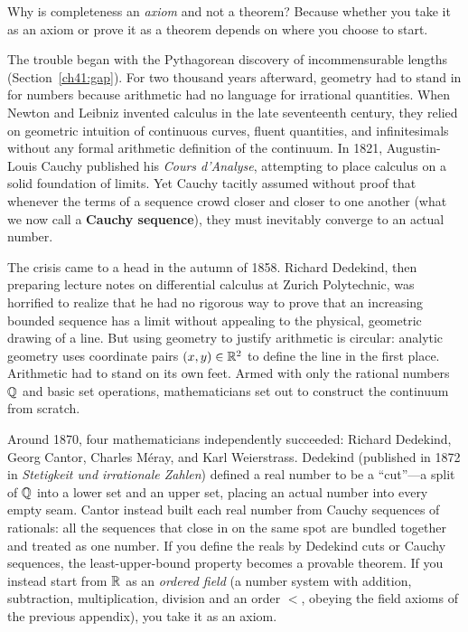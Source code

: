 \begin{historybox}
Why is completeness an \emph{axiom} and not a theorem? Because whether you take it as an
axiom or prove it as a theorem depends on where you choose to start.

The trouble began with the Pythagorean discovery of incommensurable lengths
(Section~\ref{ch41:gap}). For two thousand years afterward, geometry had to stand in
for numbers because arithmetic had no language for irrational quantities. When Newton and Leibniz
invented calculus in the late seventeenth century, they relied on geometric intuition of continuous
curves, fluent quantities, and infinitesimals without any formal arithmetic definition of the continuum.
In 1821, Augustin-Louis Cauchy published his \emph{Cours d'Analyse}, attempting to place calculus on
a solid foundation of limits. Yet Cauchy tacitly assumed without proof that whenever the terms of a
sequence crowd closer and closer to one another (what we now call a \textbf{Cauchy sequence}), they
must inevitably converge to an actual number.

The crisis came to a head in the autumn of 1858. Richard Dedekind, then preparing lecture notes
on differential calculus at Zurich Polytechnic, was horrified to realize that he had no rigorous
way to prove that an increasing bounded sequence has a limit without appealing to the physical,
geometric drawing of a line. But using geometry to justify arithmetic is circular: analytic
geometry uses coordinate pairs $(x,y) \in \mathbb{R}^2$ to define the line in the first place. Arithmetic had to
stand on its own feet. Armed with only the rational numbers $\mathbb{Q}$ and basic set operations,
mathematicians set out to construct the continuum from scratch.

Around 1870, four mathematicians independently succeeded: Richard Dedekind, Georg Cantor,
Charles M\'eray, and Karl Weierstrass. Dedekind (published in 1872 in \emph{Stetigkeit und
irrationale Zahlen}) defined a real number to be a ``cut''---a split of $\mathbb{Q}$ into a lower set
and an upper set, placing an actual number into every empty seam. Cantor instead built each real
number from Cauchy sequences of rationals: all the sequences that close in on the
same spot are bundled together and treated as one number. If you define the reals by Dedekind cuts or Cauchy sequences,
the least-upper-bound property becomes a provable theorem. If you instead start from $\mathbb{R}$ as an
\emph{ordered field} (a number system with addition, subtraction, multiplication, division and
an order $<$, obeying the field axioms of the previous appendix), you take it as an axiom.


\end{historybox}
